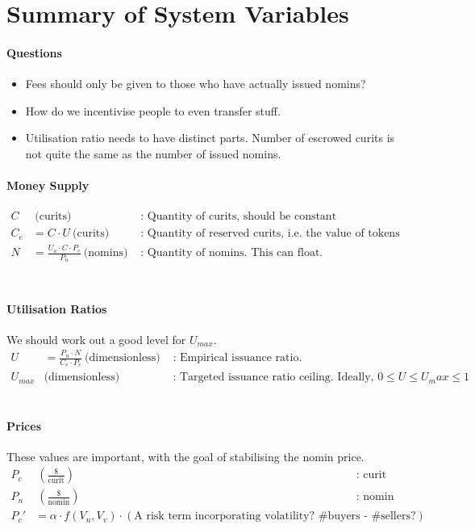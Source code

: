\documentclass{article}
\begin{document}
\section{Summary of System Variables}

\paragraph{Questions}
\begin{itemize}
\item Fees should only be given to those who have actually issued nomins?
\item How do we incentivise people to even transfer stuff.
\item Utilisation ratio needs to have distinct parts. Number of escrowed curits is not quite the same as the number of issued nomins.
\end{itemize}


\paragraph{Money Supply}
\begin{align*}
C & \ \text{(curits)} & \text{ : Quantity of curits, should be constant} \\
C_e &= C \cdot U \ \text{(curits)} & \text{ : Quantity of reserved curits, i.e. the value of tokens have been issued against } \\
N &= \frac{U_a \cdot C \cdot P_c}{P_n} \ \text{(nomins)} & \text{ : Quantity of nomins. This can float.}\\
\end{align*}
\\

\paragraph{Utilisation Ratios} We should work out a good level for $U_{max}$.
\begin{align*}
U &= \frac{P_n \cdot N}{C_e \cdot P_c} \ \text{(dimensionless)} & \text{ : Empirical issuance ratio. } \\
U_{max} & \text{(dimensionless)} & \text{ : Targeted issuance ratio ceiling. Ideally, } 0 \leq U \leq U_max \leq 1
\end{align*}
\\


\paragraph{Prices} These values are important, with the goal of stabilising the nomin price.
\begin{align*}
P_c & \ (\text{}\frac{\text{\$}}{\text{curit}}) & \text{ : curit price} \\
P_n & \ (\text{}\frac{\text{\$}}{\text{nomin}}) & \text{ : nomin price} \\
P_c' & = \alpha \cdot f(V_n, V_v) \cdot (\text{A risk term incorporating volatility? \#buyers - \#sellers?}) &
\end{align*}
\\
\end{document}
